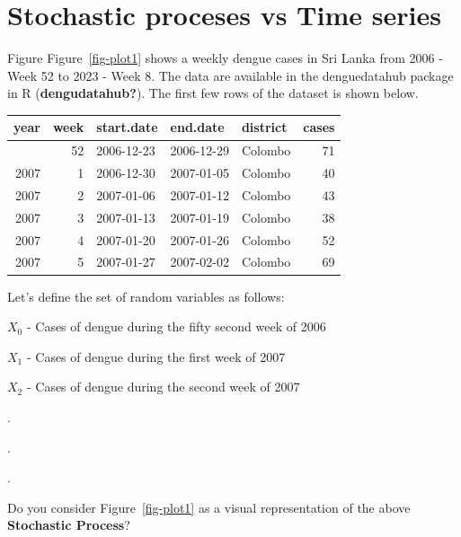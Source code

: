 \documentclass[
  letterpaper,
  DIV=11,
  numbers=noendperiod]{scrreprt}
\begin{document}
\section{Stochastic proceses vs Time
series}\label{stochastic-proceses-vs-time-series}

Figure Figure~\ref{fig-plot1} shows a weekly dengue cases in Sri Lanka
from 2006 - Week 52 to 2023 - Week 8. The data are available in the
denguedatahub package in R (\textbf{dengudatahub?}). The first few rows
of the dataset is shown below.

\begin{longtable}[]{@{}rrlllr@{}}
\toprule\noalign{}
year & week & start.date & end.date & district & cases \\
\midrule\noalign{}
\endhead
\bottomrule\noalign{}
\endlastfoot
2006 & 52 & 2006-12-23 & 2006-12-29 & Colombo & 71 \\
2007 & 1 & 2006-12-30 & 2007-01-05 & Colombo & 40 \\
2007 & 2 & 2007-01-06 & 2007-01-12 & Colombo & 43 \\
2007 & 3 & 2007-01-13 & 2007-01-19 & Colombo & 38 \\
2007 & 4 & 2007-01-20 & 2007-01-26 & Colombo & 52 \\
2007 & 5 & 2007-01-27 & 2007-02-02 & Colombo & 69 \\
\end{longtable}

Let's define the set of random variables as follows:

\(X_0\) - Cases of dengue during the fifty second week of 2006

\(X_1\) - Cases of dengue during the first week of 2007

\(X_2\) - Cases of dengue during the second week of 2007

.

.

.

Do you consider Figure~\ref{fig-plot1} as a visual representation of the
above \textbf{Stochastic Process}?
\end{document}

